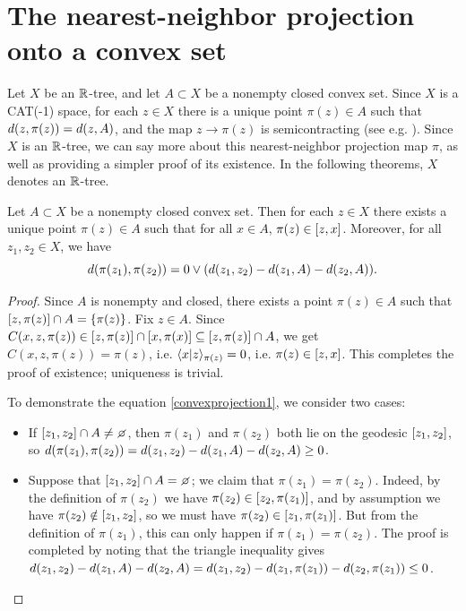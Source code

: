 \section{The nearest-neighbor projection onto a convex set}
\label{subsectionRtreegeometric}

Let $X$ be an $\R$-tree, and let $A\subset X$ be a nonempty closed convex set. Since $X$ is a CAT(-1) space, for each $z\in X$ there is a unique point $\pi(z)\in A$ such that $d(z,\pi(z)) = d(z,A)$, and the map $z\to\pi(z)$ is semicontracting (see e.g. \cite{BridsonHaefliger}). Since $X$ is an $\R$-tree, we can say more about this nearest-neighbor projection map $\pi$, as well as providing a simpler proof of its existence. In the following theorems, $X$ denotes an $\R$-tree.



\begin{lemma}
\label{lemmaconvexprojection1}
Let $A\subset X$ be a nonempty closed convex set. Then for each $z\in X$ there exists a unique point $\pi(z)\in A$ such that for all $x\in A$, $\pi(z)\in [z,x]$. Moreover, for all $z_1,z_2\in X$, we have
\begin{equation}
\label{convexprojection1}
d(\pi(z_1),\pi(z_2)) = 0\vee(d(z_1,z_2) - d(z_1,A) - d(z_2,A)).
\end{equation}
\end{lemma}
\begin{proof}
Since $A$ is nonempty and closed, there exists a point $\pi(z)\in A$ such that $[z,\pi(z)]\cap A = \{\pi(z)\}$. Fix $z\in A$. Since $C(x,z,\pi(z))\in [z,\pi(z)]\cap [x,\pi(x)]\subseteq [z,\pi(z)]\cap A$, we get $C(x,z,\pi(z)) = \pi(z)$, i.e. $\langle x|z\rangle_{\pi(z)} = 0$, i.e. $\pi(z)\in [z,x]$. This completes the proof of existence; uniqueness is trivial.

To demonstrate the equation \eqref{convexprojection1}, we consider two cases:
\begin{itemize}
\item[Case 1:] If $\geo{z_1}{z_2}\cap A\neq\emptyset$, then $\pi(z_1)$ and $\pi(z_2)$ both lie on the geodesic $[z_1,z_2]$, so $d(\pi(z_1),\pi(z_2)) = d(z_1,z_2) - d(z_1,A) - d(z_2,A) \geq 0$.
\item[Case 2:]  Suppose that $\geo{z_1}{z_2}\cap A = \emptyset$; we claim that $\pi(z_1) = \pi(z_2)$. Indeed, by the definition of $\pi(z_2)$ we have $\pi(z_2)\in [z_2,\pi(z_1)]$, and by assumption we have $\pi(z_2)\notin [z_1,z_2]$, so we must have $\pi(z_2)\in [z_1,\pi(z_1)]$. But from the definition of $\pi(z_1)$, this can only happen if $\pi(z_1) = \pi(z_2)$. The proof is completed by noting that the triangle inequality gives $d(z_1,z_2) - d(z_1,A) - d(z_2,A) = d(z_1,z_2) - d(z_1,\pi(z_1)) - d(z_2,\pi(z_1)) \leq 0$.
\end{itemize}
\end{proof}



